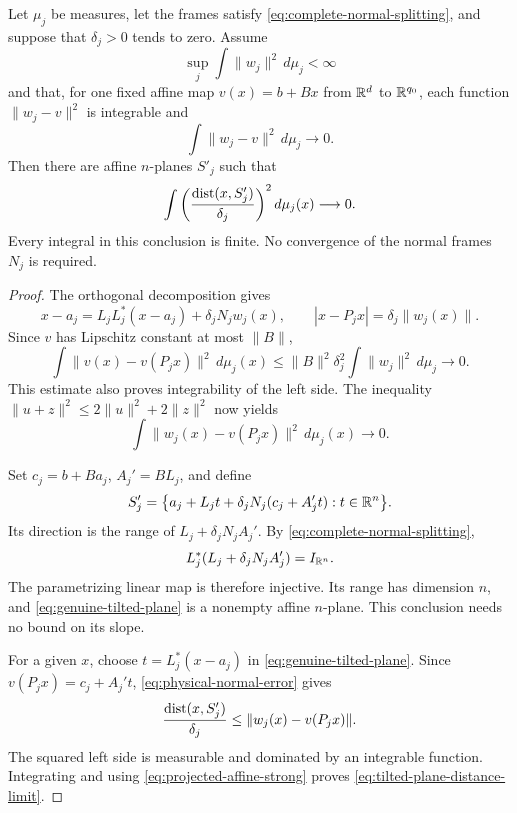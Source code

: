 \begin{lemma}
\label{lem:normal-affine-planes}
Let $\mu_j$ be measures, let the frames satisfy
\eqref{eq:complete-normal-splitting}, and suppose that
$\delta_j>0$ tends to zero. Assume
\[
 \sup_j\int\|w_j\|^2\,d\mu_j<\infty
\]
and that, for one fixed affine map $v(x)=b+Bx$ from $\mathbb R^d$ to
$\mathbb R^{q_0}$, each function $\|w_j-v\|^2$ is integrable and
\[
 \int\|w_j-v\|^2\,d\mu_j\longrightarrow0.
\]
Then there are affine $n$-planes $S'_j$ such that
\begin{equation}\label{eq:tilted-plane-distance-limit}
 \int\left(\frac{\operatorname{dist}(x,S'_j)}{\delta_j}\right)^2
       d\mu_j(x)\longrightarrow0.
\end{equation}
Every integral in this conclusion is finite. No convergence of the
normal frames $N_j$ is required.
\end{lemma}

\begin{proof}
The orthogonal decomposition gives
\begin{equation}\label{eq:physical-normal-error}
 x-a_j=L_jL_j^*(x-a_j)+\delta_jN_jw_j(x),
 \qquad |x-P_jx|=\delta_j\|w_j(x)\|.
\end{equation}
Since $v$ has Lipschitz constant at most $\|B\|$,
\begin{equation}\label{eq:affine-projection-replacement}
 \int\|v(x)-v(P_jx)\|^2\,d\mu_j(x)
 \le\|B\|^2\delta_j^2\int\|w_j\|^2\,d\mu_j
 \longrightarrow0.
\end{equation}
This estimate also proves integrability of the left side.
The inequality $\|u+z\|^2\le2\|u\|^2+2\|z\|^2$ now yields
\begin{equation}\label{eq:projected-affine-strong}
 \int\|w_j(x)-v(P_jx)\|^2\,d\mu_j(x)\longrightarrow0.
\end{equation}

Set $c_j=b+Ba_j$, $A_j'=BL_j$, and define
\begin{equation}\label{eq:genuine-tilted-plane}
 S'_j=\bigl\{a_j+L_jt+\delta_jN_j(c_j+A_j't):t\in\mathbb R^n\bigr\}.
\end{equation}
Its direction is the range of $L_j+\delta_jN_jA_j'$. By
\eqref{eq:complete-normal-splitting},
\[
 L_j^*(L_j+\delta_jN_jA_j')=I_{\mathbb R^n}.
\]
The parametrizing linear map is therefore injective. Its range has
dimension $n$, and \eqref{eq:genuine-tilted-plane} is a nonempty affine
$n$-plane. This conclusion needs no bound on its slope.

For a given $x$, choose $t=L_j^*(x-a_j)$ in
\eqref{eq:genuine-tilted-plane}. Since $v(P_jx)=c_j+A_j't$,
\eqref{eq:physical-normal-error} gives
\[
 \frac{\operatorname{dist}(x,S'_j)}{\delta_j}
 \le\|w_j(x)-v(P_jx)\|.
\]
The squared left side is measurable and dominated by an integrable
function. Integrating and using \eqref{eq:projected-affine-strong}
proves \eqref{eq:tilted-plane-distance-limit}.
\end{proof}

